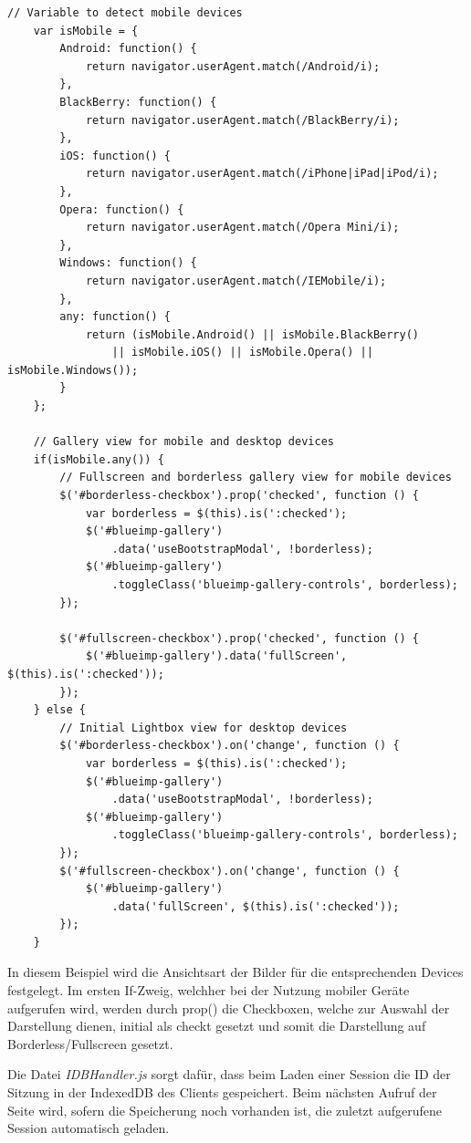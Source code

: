 	\begin{lstlisting}[caption={Auszug aus app.js (Webclient)}, label=list_client]
	// Variable to detect mobile devices
	var isMobile = {
	    Android: function() {
			return navigator.userAgent.match(/Android/i);
		},
		BlackBerry: function() {
			return navigator.userAgent.match(/BlackBerry/i);
		},
		iOS: function() {
			return navigator.userAgent.match(/iPhone|iPad|iPod/i);
		},
		Opera: function() {
			return navigator.userAgent.match(/Opera Mini/i);
		},
		Windows: function() {
			return navigator.userAgent.match(/IEMobile/i);
		},
		any: function() {
			return (isMobile.Android() || isMobile.BlackBerry()
				|| isMobile.iOS() || isMobile.Opera() || isMobile.Windows());
		}
	};
	
	// Gallery view for mobile and desktop devices
	if(isMobile.any()) {
		// Fullscreen and borderless gallery view for mobile devices
		$('#borderless-checkbox').prop('checked', function () {
			var borderless = $(this).is(':checked');
			$('#blueimp-gallery')
				.data('useBootstrapModal', !borderless);
			$('#blueimp-gallery')
				.toggleClass('blueimp-gallery-controls', borderless);
		});
	
		$('#fullscreen-checkbox').prop('checked', function () {
			$('#blueimp-gallery').data('fullScreen', $(this).is(':checked'));
		});
	} else {
		// Initial Lightbox view for desktop devices
		$('#borderless-checkbox').on('change', function () {
			var borderless = $(this).is(':checked');
			$('#blueimp-gallery')
				.data('useBootstrapModal', !borderless);
			$('#blueimp-gallery')
				.toggleClass('blueimp-gallery-controls', borderless);
		});
		$('#fullscreen-checkbox').on('change', function () {
			$('#blueimp-gallery')
				.data('fullScreen', $(this).is(':checked'));
		});
	}	
	\end{lstlisting}
In diesem Beispiel wird die Ansichtsart der Bilder für die entsprechenden Devices 
festgelegt. Im ersten If-Zweig, welchher bei der Nutzung mobiler Geräte aufgerufen 
wird, werden durch prop() die Checkboxen, welche zur Auswahl der Darstellung 
dienen, initial als checkt gesetzt und somit die Darstellung auf Borderless/Fullscreen 
gesetzt.

Die Datei \textit{IDBHandler.js} sorgt dafür, dass beim Laden einer Session die ID der Sitzung in der IndexedDB des Clients gespeichert. Beim nächsten Aufruf der Seite wird,
sofern die Speicherung noch vorhanden ist, die zuletzt aufgerufene Session automatisch geladen.